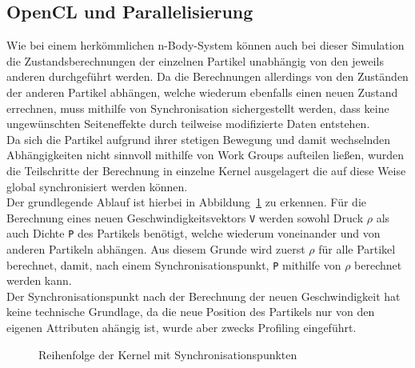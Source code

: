 \subsection{OpenCL und Parallelisierung}
Wie bei einem herkömmlichen n-Body-System können auch bei dieser Simulation die Zustandsberechnungen der einzelnen Partikel unabhängig von den jeweils anderen durchgeführt werden. Da die Berechnungen allerdings von den Zuständen der anderen Partikel abhängen, welche wiederum ebenfalls einen neuen Zustand errechnen, muss mithilfe von Synchronisation sichergestellt werden, dass keine ungewünschten Seiteneffekte durch teilweise modifizierte Daten entstehen.\\
Da sich die Partikel aufgrund ihrer stetigen Bewegung und damit wechselnden Abhängigkeiten nicht sinnvoll mithilfe von Work Groups aufteilen ließen, wurden die Teilschritte der Berechnung in einzelne Kernel ausgelagert die auf diese Weise global synchronisiert werden können.\\
Der grundlegende Ablauf ist hierbei in Abbildung~\ref{fig:simulation_kernelablauf} zu erkennen. Für die Berechnung eines neuen Geschwindigkeitsvektors \texttt{V} werden sowohl Druck $\rho$  als auch Dichte \texttt{P} des Partikels benötigt, welche wiederum voneinander und von anderen Partikeln abhängen. Aus diesem Grunde wird zuerst $\rho$ für alle Partikel berechnet, damit, nach einem Synchronisationspunkt, \texttt{P} mithilfe von $\rho$ berechnet werden kann. \\
Der Synchronisationspunkt nach der Berechnung der neuen Geschwindigkeit hat keine technische Grundlage, da die neue Position des Partikels nur von den eigenen Attributen ahängig ist, wurde aber zwecks Profiling eingeführt.
\begin{figure}
  \centering
    
  \caption{Reihenfolge der Kernel mit Synchronisationspunkten}
  \label{fig:simulation_kernelablauf}
\end{figure}
